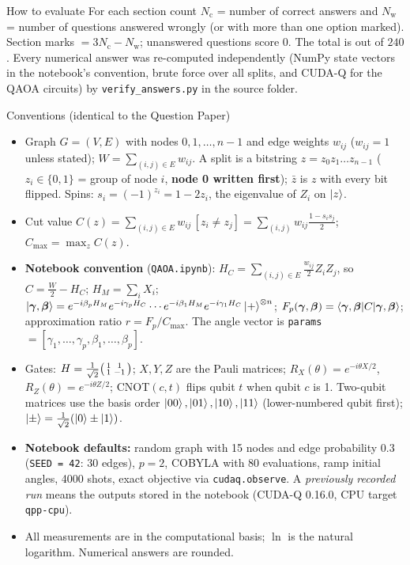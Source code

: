\documentclass[11pt,a4paper]{article}
\begin{document}
\begin{infobox}{How to evaluate}
For each section count $N_{\mathrm c}$ = number of correct answers and $N_{\mathrm w}$ = number of questions answered wrongly (or with more than one option marked). Section marks $= 3N_{\mathrm c} - N_{\mathrm w}$; unanswered questions score $0$. The total is out of $240$.
Every numerical answer was re-computed independently (NumPy state vectors in the notebook's convention, brute force over all splits, and CUDA-Q for the QAOA circuits) by
\texttt{verify\_answers.py} in the source folder.
\end{infobox}
\begin{infobox}{Conventions (identical to the Question Paper)}

\begin{itemize}[leftmargin=1.2em, itemsep=1pt, topsep=2pt]
\item Graph $G = (V, E)$ with nodes $0, 1, \dots, n-1$ and edge weights $w_{ij}$ ($w_{ij} = 1$ unless stated); $W = \sum_{(i,j)\in E} w_{ij}$.
      A split is a bitstring $z = z_0z_1\dots z_{n-1}$ ($z_i \in \{0,1\}$ = group of node $i$, \textbf{node 0 written first});
      $\bar z$ is $z$ with every bit flipped. Spins: $s_i = (-1)^{z_i} = 1 - 2z_i$, the eigenvalue of $Z_i$ on $\ket z$.
\item Cut value $C(z) = \sum_{(i,j)\in E} w_{ij}\,[z_i \neq z_j] = \sum_{(i,j)} w_{ij}\frac{1 - s_is_j}{2}$; $C_{\max} = \max_z C(z)$.
\item \textbf{Notebook convention} (\texttt{QAOA.ipynb}): $H_C = \sum_{(i,j)\in E}\frac{w_{ij}}{2}Z_iZ_j$, so $C = \frac W2 - H_C$;
      $H_M = \sum_i X_i$; $\ket{\boldsymbol\gamma,\boldsymbol\beta} = e^{-i\beta_pH_M}e^{-i\gamma_pH_C}\cdots e^{-i\beta_1H_M}e^{-i\gamma_1H_C}\ket{+}^{\otimes n}$;
      $F_p(\boldsymbol\gamma,\boldsymbol\beta) = \braket{\boldsymbol\gamma,\boldsymbol\beta|C|\boldsymbol\gamma,\boldsymbol\beta}$; approximation ratio $r = F_p/C_{\max}$.
      The angle vector is \texttt{params} $= [\gamma_1, \dots, \gamma_p, \beta_1, \dots, \beta_p]$.
\item Gates: $H = \frac{1}{\sqrt2}\begin{psmallmatrix}1&1\\1&-1\end{psmallmatrix}$; $X, Y, Z$ are the Pauli matrices; $R_X(\theta) = e^{-i\theta X/2}$,
      $R_Z(\theta) = e^{-i\theta Z/2}$; CNOT$(c, t)$ flips qubit $t$ when qubit $c$ is 1. Two-qubit matrices use the basis order
      $\ket{00}, \ket{01}, \ket{10}, \ket{11}$ (lower-numbered qubit first); $\ket{\pm} = \frac{1}{\sqrt2}(\ket0 \pm \ket1)$.
\item \textbf{Notebook defaults:} random graph with 15 nodes and edge probability $0.3$ (\texttt{SEED = 42}: 30 edges), $p = 2$, COBYLA with
      80 evaluations, ramp initial angles, 4000 shots, exact objective via \texttt{cudaq.observe}. A \emph{previously recorded run} means the
      outputs stored in the notebook (CUDA-Q 0.16.0, CPU target \texttt{qpp-cpu}).
\item All measurements are in the computational basis; $\ln$ is the natural logarithm. Numerical answers are rounded.
\end{itemize}
\end{infobox}
\newpage
\end{document}

